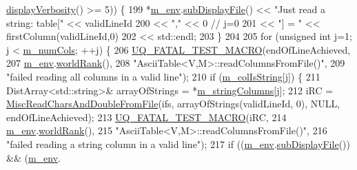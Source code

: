 \begin{DoxyCode}
{{      \hyperlink{class_q_u_e_s_o_1_1_base_environment_a1fe5f244fc0316a0ab3e37463f108b96}{displayVerbosity}() >= 5)) \{
199       *\hyperlink{class_q_u_e_s_o_1_1_ascii_table_a2ba907db652aa02d53d493980d7a3753}{m\_env}.\hyperlink{class_q_u_e_s_o_1_1_base_environment_a8a0064746ae8dddfece4229b9ad374d6}{subDisplayFile}() << \textcolor{stringliteral}{"Just read a string: table["} << validLineId
200                               << \textcolor{stringliteral}{","}                          << 0 \textcolor{comment}{// j=0}
201                               << \textcolor{stringliteral}{"] = "}                       << firstColumn(validLineId,0)
202                               << std::endl;
203     \}
204 
205     \textcolor{keywordflow}{for} (\textcolor{keywordtype}{unsigned} \textcolor{keywordtype}{int} j=1; j < \hyperlink{class_q_u_e_s_o_1_1_ascii_table_ada886c8db06d2d618f2898ad2cf2bd87}{m\_numCols}; ++j) \{
206       \hyperlink{_defines_8h_a56d63d18d0a6d45757de47fcc06f574d}{UQ\_FATAL\_TEST\_MACRO}(endOfLineAchieved,
207                           \hyperlink{class_q_u_e_s_o_1_1_ascii_table_a2ba907db652aa02d53d493980d7a3753}{m\_env}.\hyperlink{class_q_u_e_s_o_1_1_base_environment_a78b57112bbd0e6dd0e8afec00b40ffa7}{worldRank}(),
208                           \textcolor{stringliteral}{"AsciiTable<V,M>::readColumnsFromFile()"},
209                           \textcolor{stringliteral}{"failed reading all columns in a valid line"});
210       \textcolor{keywordflow}{if} (\hyperlink{class_q_u_e_s_o_1_1_ascii_table_a1c84e461d75e0846c156617f222c2ec3}{m\_colIsString}[j]) \{
211         DistArray<std::string>& arrayOfStrings = *\hyperlink{class_q_u_e_s_o_1_1_ascii_table_a14ba55d29e9a4ddeb14cd5acd8a27268}{m\_stringColumns}[j];
212         iRC = \hyperlink{namespace_q_u_e_s_o_a575d3153d82b7df3d78ad5cfbf2b83b7}{MiscReadCharsAndDoubleFromFile}(ifs, arrayOfStrings(validLineId,
      0), NULL, endOfLineAchieved);
213         \hyperlink{_defines_8h_a56d63d18d0a6d45757de47fcc06f574d}{UQ\_FATAL\_TEST\_MACRO}(iRC,
214                             \hyperlink{class_q_u_e_s_o_1_1_ascii_table_a2ba907db652aa02d53d493980d7a3753}{m\_env}.\hyperlink{class_q_u_e_s_o_1_1_base_environment_a78b57112bbd0e6dd0e8afec00b40ffa7}{worldRank}(),
215                             \textcolor{stringliteral}{"AsciiTable<V,M>::readColumnsFromFile()"},
216                             \textcolor{stringliteral}{"failed reading a string column in a valid line"});
217         \textcolor{keywordflow}{if} ((\hyperlink{class_q_u_e_s_o_1_1_ascii_table_a2ba907db652aa02d53d493980d7a3753}{m\_env}.\hyperlink{class_q_u_e_s_o_1_1_base_environment_a8a0064746ae8dddfece4229b9ad374d6}{subDisplayFile}()) && (\hyperlink{class_q_u_e_s_o_1_1_ascii_table_a2ba907db652aa02d53d493980d7a3753}{m\_env}.
}}
\end{DoxyCode}
